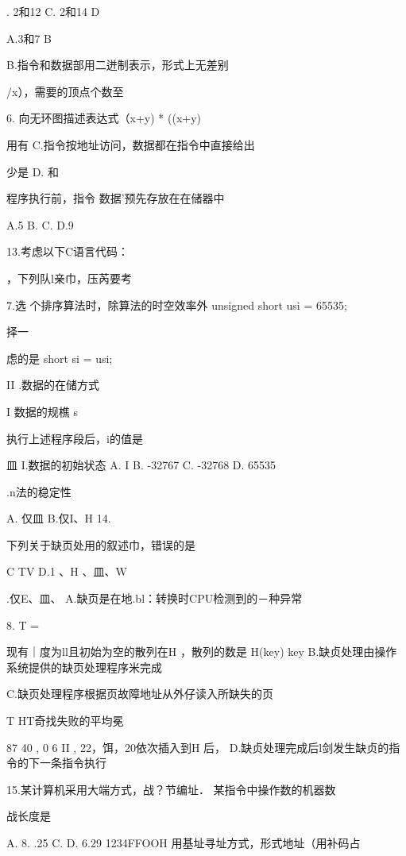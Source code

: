     . 2和12    C. 2和14    D

  A.3和7    B

    B.指令和数据部用二迸制表示，形式上无差别

    /x），需要的顶点个数至

6.    向无环图描述表达式（x+y) * ((x+y)

   用有    C.指令按地址访问，数据都在指令中直接给出

  少是    D.    和

    程序执行前，指令   数据'预先存放在在储器中

   A.5    B.      C.      D.9

    13.考虑以下C语言代码：

    ，下列队l亲巾，压芮要考

7.选   个排序算法时，除算法的时空效率外    unsigned short usi = 65535;

    择一

  虑的是    short si = usi;

    II .数据的在储方式

   I 数据的规樵    s

    执行上述程序段后，i的值是

   皿    I.数据的初始状态    A. I     B. -32767    C. -32768    D. 65535

    .n法的稳定性

   A. 仅皿    B.仅I、H    14.

    下列关于缺页处用的叙述巾，错误的是

  C    TV    D.1 、H 、皿、W

    .仅E、皿、    A.缺页是在地.bl：转换时CPU检测到的－种异常

8.    T    =

   现有｜度为ll且初始为空的散列在H ，散列的数是 H(key)  key    B.缺贞处理由操作系统提供的缺页处理程序米完成


    C.缺页处理程序根据页故障地址从外仔读入所缺失的页

    T    HT奇找失败的平均冕

   87  40 , 0  6  II , 22，饵，20依次插入到H 后，    D.缺贞处理完成后l剑发生缺贞的指令的下一条指令执行

    15.某计算机采用大端方式，战？节编址． 某指令中操作数的机器数

   战长度是

   A.      8. .25     C.      D. 6.29    1234FFOOH    用基址寻址方式，形式地址（用补码占

